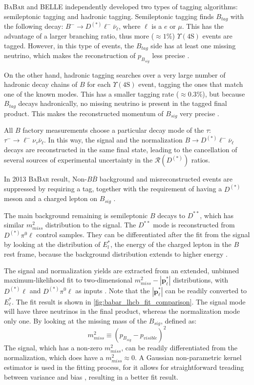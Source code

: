 \documentclass[12pt,letterpaper]{article}
\renewcommand{\vec}[1]{\mathbf{#1}}                   %
\def\BaBar/{\textsc{BaBar}}
\def\Y4S/{\ensuremath{\Upsilon(\text{4S})}}
\def\RDDst/{\ensuremath{\mathcal{R}(D^{(*)})}}
\begin{document}
\BaBar/ and BELLE independently developed two types of tagging algorithms:
semileptonic tagging and hadronic tagging.
Semileptonic tagging finds $B_{tag}$ with the following decay:
$B^- \rightarrow D^{(*)} \ell^- \bar{\nu}_\ell$, where $\ell$ is a $e$ or $\mu$.
This has the advantage of a larger branching ratio, thus more ($\approx 1\%$)
\Y4S/ events are tagged.
However, in this type of events, the $B_{tag}$ side has at least one missing neutrino, which
makes the reconstruction of $p_{B_{sig}}$ less precise \cite{Ciezarek:2017yzh}.

On the other hand, hadronic tagging searches over a very large number of
hadronic decay chains of $B$ for each \Y4S/ event, tagging the ones that match
one of the known modes.
This has a smaller tagging rate ($\approx 0.3\%$), but because $B_{tag}$ decays
hadronically, no missing neutrino is present in the tagged final product.
This makes the reconstructed momentum of $B_{sig}$ very
precise \cite{Lees:2013uzd,Ciezarek:2017yzh}.

All $B$ factory measurements choose a particular decay mode of the $\tau$:
$\tau^- \rightarrow \ell^- \nu_\tau \bar{\nu}_\ell$. In this way, the signal and
the normalization $B \rightarrow D^{(*)} \ell^- \overline{\nu}_\ell$ decays
are reconstructed in the same final state, leading to the cancellation of
several sources of experimental uncertainty in the \RDDst/ ratios.

In 2013 \BaBar/ result,
Non-$B \overline{B}$ background and misreconstructed events are suppressed by
requiring a tag, together with the requirement of having a $D^{(*)}$ meson and a
charged lepton on $B_{sig}$ \cite{Ciezarek:2017yzh}.

The main background remaining is semileptonic $B$ decays to $D^{**}$, which has
similar $m^2_{miss}$ distribution to the signal.
The $D^{**}$ mode is reconstructed from $D^{(*)}\pi^0\ell$ control samples.
They can be differentiated after the fit from the signal by looking at the distribution of
$E^{*}_l$, the energy of the charged lepton in the $B$ rest
frame, because the background distribution extends to higher
energy \cite{Ciezarek:2017yzh}.

The signal and normalization yields are extracted from an extended, unbinned maximum-likelihood fit to two-dimensional $m^2_{miss}-|\vec{p}^*_\ell|$ distributions, with $D^{(*)}\ell$ and $D^{(*)}\pi^0\ell$ as inputs \cite{Lees:2013uzd}.
Note that the $|\vec{p}^*_\ell|$ can be readily converted to $E^*_\ell$.
The fit result is shown in \autoref{fig:babar_lhcb_fit_comparison}.
The signal mode will have three neutrinos in the final product,
whereas the normalization mode only one.
By looking at the missing mass of the $B_{sig}$, defined as:
\begin{equation}
    m^2_{miss} \equiv \left(p_{B_{sig}} - p_{visible}\right)^2
\end{equation}
The signal, which has a non-zero $m^2_{miss}$, can be readily differentiated
from the normalization, which does have a $m^2_{miss} \approx 0$.
A Gaussian non-parametric kernel estimator is used in the
fitting process, for it allows for straightforward treading between variance
and bias \cite{Lees:2013uzd}, resulting in a better fit result.
\end{document}
